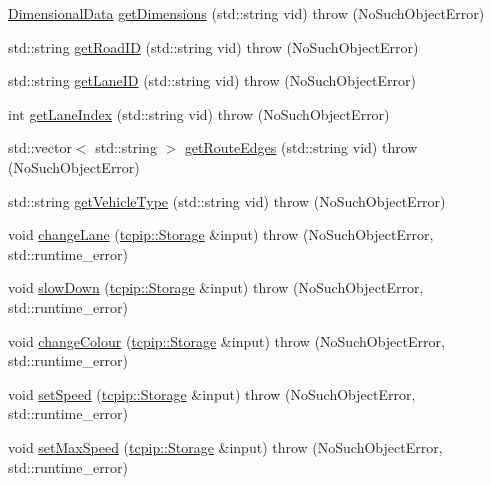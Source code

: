 \begin{DoxyCompactItemize}
\hyperlink{class_dimensional_data}{Dimensional\+Data} \hyperlink{classtraci__api_1_1_vehicle_manager_a626f8aea7366479ec9bdd49f58f5b530}{get\+Dimensions} (std\+::string vid)  throw (\+No\+Such\+Object\+Error)
\item 
std\+::string \hyperlink{classtraci__api_1_1_vehicle_manager_a3cbdffab3f5fd337a6de08a14b87803e}{get\+Road\+ID} (std\+::string vid)  throw (\+No\+Such\+Object\+Error)
\item 
std\+::string \hyperlink{classtraci__api_1_1_vehicle_manager_a5cf2db6460fa94ccb2b3d489369b7d0e}{get\+Lane\+ID} (std\+::string vid)  throw (\+No\+Such\+Object\+Error)
\item 
int \hyperlink{classtraci__api_1_1_vehicle_manager_a8daaf314dfb440dfb48575b072cd0d41}{get\+Lane\+Index} (std\+::string vid)  throw (\+No\+Such\+Object\+Error)
\item 
std\+::vector$<$ std\+::string $>$ \hyperlink{classtraci__api_1_1_vehicle_manager_a399053f44944093adf9a00536bf86bba}{get\+Route\+Edges} (std\+::string vid)  throw (\+No\+Such\+Object\+Error)
\item 
std\+::string \hyperlink{classtraci__api_1_1_vehicle_manager_a946553555fa7a2a9f95b4baced6f0dbe}{get\+Vehicle\+Type} (std\+::string vid)  throw (\+No\+Such\+Object\+Error)
\item 
void \hyperlink{classtraci__api_1_1_vehicle_manager_a5441f5ea01a06473f831ac85b9a6c70f}{change\+Lane} (\hyperlink{classtcpip_1_1_storage}{tcpip\+::\+Storage} \&input)  throw (\+No\+Such\+Object\+Error, std\+::runtime\+\_\+error)
\item 
void \hyperlink{classtraci__api_1_1_vehicle_manager_afaa8625978e32aab7ca85cd52ce450a8}{slow\+Down} (\hyperlink{classtcpip_1_1_storage}{tcpip\+::\+Storage} \&input)  throw (\+No\+Such\+Object\+Error, std\+::runtime\+\_\+error)
\item 
void \hyperlink{classtraci__api_1_1_vehicle_manager_a6829e259033dcd95611755953f164ef0}{change\+Colour} (\hyperlink{classtcpip_1_1_storage}{tcpip\+::\+Storage} \&input)  throw (\+No\+Such\+Object\+Error, std\+::runtime\+\_\+error)
\item 
void \hyperlink{classtraci__api_1_1_vehicle_manager_a40adaaa7aaaae5708855c6c4715204fe}{set\+Speed} (\hyperlink{classtcpip_1_1_storage}{tcpip\+::\+Storage} \&input)  throw (\+No\+Such\+Object\+Error, std\+::runtime\+\_\+error)
\item 
void \hyperlink{classtraci__api_1_1_vehicle_manager_a5bd46032db2b057eb7e5a5c61d043827}{set\+Max\+Speed} (\hyperlink{classtcpip_1_1_storage}{tcpip\+::\+Storage} \&input)  throw (\+No\+Such\+Object\+Error, std\+::runtime\+\_\+error)

\end{DoxyCompactItemize}
